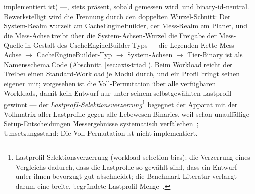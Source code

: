 \begin{nurlang}
implementiert ist) ---, stets präsent, sobald gemessen wird, und binary-id-neutral. Bewerkstelligt wird
die Trennung durch den doppelten Wurzel-Schnitt: Der System-Realm wurzelt am CacheEngineBuilder, der
Mess-Realm am Planer, und die Mess-Achse treibt über die System-Achsen-Wurzel die Freigabe der
Mess-Quelle in Gestalt des CacheEngineBuilder-Typs --- die Legenden-Kette Mess-Achse $\to$
CacheEngineBuilder-Typ $\to$ System-Achsen $\to$ Tier-Binary ist als Namensschema Code
(Abschnitt~\ref{sec:axis-triad}). Beim Workload reicht der Treiber einen Standard-Workload je Modul
durch, und ein Profil bringt seinen eigenen mit; vorgesehen ist die Voll-Permutation über alle
verfügbaren Workloads, damit kein Entwurf nur unter seinem selbstgewählten Lastprofil gewinnt --- der
\emph{Lastprofil-Selektionsverzerrung}\footnote{Lastprofil-Selektionsverzerrung (workload selection
bias): die Verzerrung eines Vergleichs dadurch, dass die Lastprofile so gewählt sind, dass ein Entwurf
unter ihnen bevorzugt gut abschneidet; die Benchmark-Literatur verlangt darum eine breite, begründete
Lastprofil-Menge~\cite{blackburn2006dacapo,blackburn2016truth}.} begegnet der Apparat mit der Vollmatrix
aller Lastprofile gegen alle Lebewesen-Binaries, weil schon unauffällige Setup-Entscheidungen
Messergebnisse systematisch verfälschen~\cite{mytkowicz2009wrongdata}; Umsetzungsstand: Die
Voll-Permutation ist nicht implementiert.
\end{nurlang}
